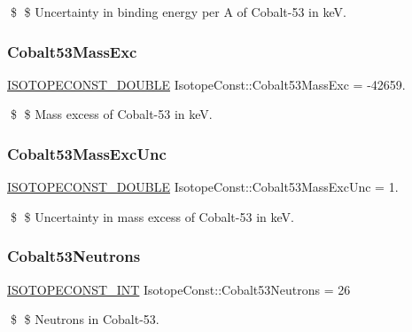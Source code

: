 \$ \$ Uncertainty in binding energy per A of Cobalt-\/53 in keV. \mbox{\label{group___isotope_const-_cobalt-_co53_ga8fd61d0e174f09d52a70940c43d23974}} 
\subsubsection{\texorpdfstring{Cobalt53\+Mass\+Exc}{Cobalt53MassExc}}
{\footnotesize\ttfamily \mbox{\hyperlink{group___isotope_const-_macros_ga8f45a7272ce02c0b4c65c44636ed719a}{I\+S\+O\+T\+O\+P\+E\+C\+O\+N\+S\+T\+\_\+\+D\+O\+U\+B\+LE}} Isotope\+Const\+::\+Cobalt53\+Mass\+Exc = -\/42659.}

\$ \$ Mass excess of Cobalt-\/53 in keV. \mbox{\label{group___isotope_const-_cobalt-_co53_ga7cf9395a73a2a3c733091f327add27b0}} 
\subsubsection{\texorpdfstring{Cobalt53\+Mass\+Exc\+Unc}{Cobalt53MassExcUnc}}
{\footnotesize\ttfamily \mbox{\hyperlink{group___isotope_const-_macros_ga8f45a7272ce02c0b4c65c44636ed719a}{I\+S\+O\+T\+O\+P\+E\+C\+O\+N\+S\+T\+\_\+\+D\+O\+U\+B\+LE}} Isotope\+Const\+::\+Cobalt53\+Mass\+Exc\+Unc = 1.}

\$ \$ Uncertainty in mass excess of Cobalt-\/53 in keV. \mbox{\label{group___isotope_const-_cobalt-_co53_ga6f6724c738621eb1c28f10a0db99d365}} 
\subsubsection{\texorpdfstring{Cobalt53\+Neutrons}{Cobalt53Neutrons}}
{\footnotesize\ttfamily \mbox{\hyperlink{group___isotope_const-_macros_ga5f18360b3e99483a35c32d789e62621c}{I\+S\+O\+T\+O\+P\+E\+C\+O\+N\+S\+T\+\_\+\+I\+NT}} Isotope\+Const\+::\+Cobalt53\+Neutrons = 26}

\$ \$ Neutrons in Cobalt-\/53. \mbox{\label{group___isotope_const-_cobalt-_co53_ga7c6e7662081375b462a21a606a0c3019}} 
